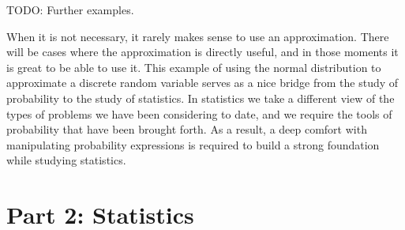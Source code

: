 \documentclass[
  letterpaper,
  DIV=11,
  numbers=noendperiod]{scrreprt}
\begin{document}
TODO: Further examples.

When it is not necessary, it rarely makes sense to use an approximation.
There will be cases where the approximation is directly useful, and in
those moments it is great to be able to use it. This example of using
the normal distribution to approximate a discrete random variable serves
as a nice bridge from the study of probability to the study of
statistics. In statistics we take a different view of the types of
problems we have been considering to date, and we require the tools of
probability that have been brought forth. As a result, a deep comfort
with manipulating probability expressions is required to build a strong
foundation while studying statistics.

\part{Part 2: Statistics}
\end{document}
